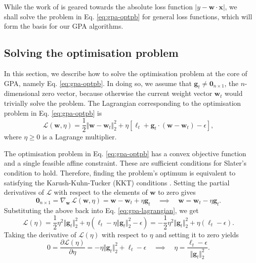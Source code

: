 While the work of \citet{crammer06} is geared towards the absolute loss function $|y - \mathbf{w}\cdot\mathbf{x}|$, we shall solve the problem in Eq. \eqref{eq:gpa-optpb} for general loss functions, which will form the basis for our GPA algorithms.

\subsection{Solving the optimisation problem}
\label{sec:gpa-optpb}

In this section, we describe how to solve the optimisation problem at the core of GPA, namely Eq. \eqref{eq:gpa-optpb}. In doing so, we assume that $\mathbf{g}_t \neq \mathbf{0}_{n\times 1}$, the $n$-dimensional zero vector, because otherwise the current weight vector $\mathbf{w}_t$ would trivially solve the problem. The Lagrangian corresponding to the optimisation problem in Eq. \eqref{eq:gpa-optpb} is
\begin{equation}
\label{eq:gpa-lagrangian}
	\mathcal{L}(\mathbf{w}, \eta)
	= \frac{1}{2}\Vert\mathbf{w} - \mathbf{w}_{t}\Vert_2^2 + \eta[\ell_t + \mathbf{g}_t\cdot(\mathbf{w} - \mathbf{w}_t) - \epsilon],
\end{equation}
where $\eta \geq 0$ is a Lagrange multiplier.

The optimisation problem in Eq. \eqref{eq:gpa-optpb} has a convex objective function and a single feasible affine constraint. These are sufficient conditions for Slater's condition to hold. Therefore, finding the problem's optimum is equivalent to satisfying the Karush-Kuhn-Tucker (KKT) conditions \citep{bv_cvxbook}. Setting the partial derivatives of $\mathcal{L}$ with respect to the elements of $\mathbf{w}$ to zero gives
\begin{equation}
\label{eq:gpa-optpb-kkt}
	\mathbf{0}_{n\times 1} = \nabla_\mathbf{w}\,\mathcal{L}(\mathbf{w}, \eta) = \mathbf{w} - \mathbf{w}_{t} + \eta\mathbf{g}_t
	\quad \implies \quad
	\mathbf{w} = \mathbf{w}_{t} - \eta\mathbf{g}_t.
\end{equation}
Substituting the above back into Eq. \eqref{eq:gpa-lagrangian}, we get
\begin{equation}
	\mathcal{L}(\eta)
	= \frac{1}{2}\eta^2\Vert\mathbf{g}_t\Vert_2^2 + \eta(\ell_t - \eta\Vert\mathbf{g}_t\Vert_2^2 - \epsilon)
	= -\frac{1}{2}\eta^2\Vert\mathbf{g}_t\Vert_2^2 + \eta(\ell_t - \epsilon).
\end{equation}
Taking the derivative of $\mathcal{L}(\eta)$ with respect to $\eta$ and setting it to zero yields
\begin{equation}
	0 = \frac{\partial\mathcal{L}(\eta)}{\partial\eta} = -\eta\Vert\mathbf{g}_t\Vert_2^2 + \ell_t - \epsilon
	\quad \implies \quad
	\eta = \frac{\ell_t - \epsilon}{\Vert\mathbf{g}_t\Vert_2^2}.
\end{equation}

